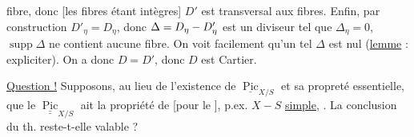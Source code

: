 fibre, donc [les fibres étant intègres] $D'$ est transversal aux fibres. Enfin,  par construction $D'_\eta=D_\eta$, donc $\Delta=D_{\eta}-D'_{\eta}$ est un diviseur tel que $\Delta_\eta=0$, $\operatorname{supp}\Delta$ ne contient aucune fibre. On voit facilement qu'un tel $\Delta$ est nul (\uline{lemme} : expliciter). On a donc $D=D'$, donc $D$ est Cartier.


\uline{Question !} Supposons, au lieu de l'existence de $\underline{\operatorname{Pic}}_{X/S}$ et sa propreté essentielle, que le  $\underline{\underline{\operatorname{Pic}}}_{X/S}$ ait la propriété de   [pour le ], p.ex. $X\mathbin{-}S$ \uline{simple}, .  La conclusion du th. reste-t-elle valable ?
